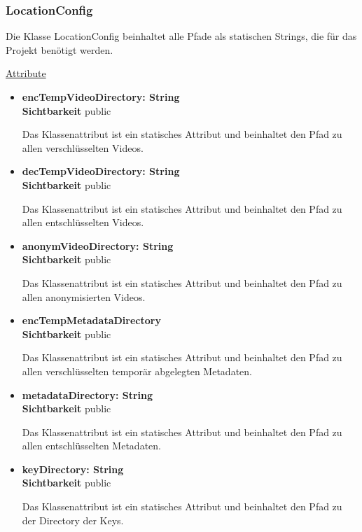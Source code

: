 \subsubsection{LocationConfig} \label{service:klasse:LocationConfig}
Die Klasse LocationConfig beinhaltet alle Pfade als statischen Strings, die für das Projekt benötigt werden.

\underline{Attribute}
\begin{itemize}
\itemsep0pt
\item \textbf{encTempVideoDirectory: String} \hfill\\ 
\textbf{Sichtbarkeit} public

Das Klassenattribut ist ein statisches Attribut und beinhaltet den Pfad zu allen verschlüsselten Videos.

\item \textbf{decTempVideoDirectory: String} \hfill\\ 
\textbf{Sichtbarkeit} public
 
Das Klassenattribut ist ein statisches Attribut und beinhaltet den Pfad zu allen entschlüsselten Videos.

\item \textbf{anonymVideoDirectory: String} \hfill\\ 
\textbf{Sichtbarkeit} public

Das Klassenattribut ist ein statisches Attribut und beinhaltet den Pfad zu allen anonymisierten Videos.

\item \textbf{encTempMetadataDirectory} \hfill\\ 
\textbf{Sichtbarkeit} public

Das Klassenattribut ist ein statisches Attribut und beinhaltet den Pfad zu allen verschlüsselten temporär abgelegten Metadaten.

\item \textbf{metadataDirectory: String} \hfill\\ 
\textbf{Sichtbarkeit} public

Das Klassenattribut ist ein statisches Attribut und beinhaltet den Pfad zu allen entschlüsselten Metadaten.

\item \textbf{keyDirectory: String} \hfill\\ 
\textbf{Sichtbarkeit} public

Das Klassenattribut ist ein statisches Attribut und beinhaltet den Pfad zu der Directory der Keys.
\end{itemize}
